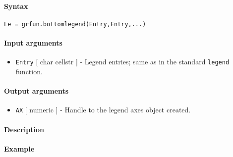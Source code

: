 


	\paragraph{Syntax}\label{syntax}

\begin{verbatim}
Le = grfun.bottomlegend(Entry,Entry,...)
\end{verbatim}

\paragraph{Input arguments}\label{input-arguments}

\begin{itemize}
\itemsep1pt\parskip0pt
\item
  \texttt{Entry} {[} char \textbar{} cellstr {]} - Legend entries; same
  as in the standard \texttt{legend} function.
\end{itemize}

\paragraph{Output arguments}\label{output-arguments}

\begin{itemize}
\itemsep1pt\parskip0pt
\item
  \texttt{AX} {[} numeric {]} - Handle to the legend axes object
  created.
\end{itemize}

\paragraph{Description}\label{description}

\paragraph{Example}\label{example}



